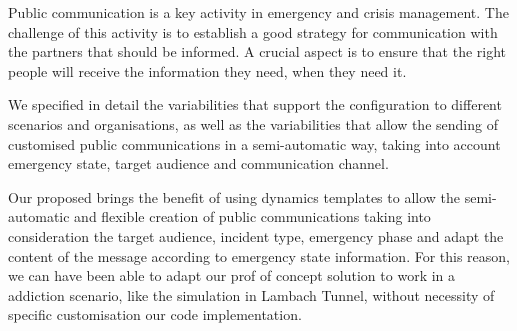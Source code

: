  \label{chapter:conclusion}

Public communication is a key activity in emergency and crisis management. The challenge of this activity is to establish a good strategy for communication with the partners that should be informed. A crucial aspect is to ensure that the right people will receive the information they need, when they need it.

We specified in detail the variabilities that support the configuration to different scenarios and organisations, as well as the variabilities that allow the sending of customised public communications in a semi-automatic way, taking into account emergency state, target audience and communication channel.

Our proposed brings the benefit of using dynamics templates to allow the semi-automatic and flexible creation of public communications taking into consideration the target audience, incident type, emergency phase and adapt the content of the message according to emergency state information. For this reason, we can have been able to adapt our prof of concept solution to work in a addiction scenario, like the simulation in Lambach Tunnel, without necessity of specific customisation our code implementation.  